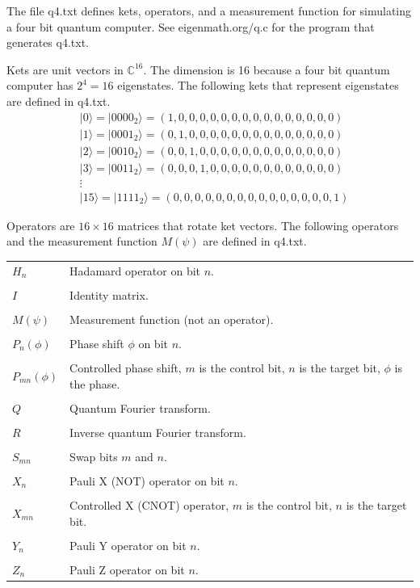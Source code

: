 \documentclass[12pt]{article}
\begin{document}
\noindent
The file q4.txt defines kets, operators, and a measurement function
for simulating a four bit quantum computer.
See eigenmath.org/q.c for the program that generates q4.txt.

\bigskip
\noindent
Kets are unit vectors in $\mathbb{C}^{16}$.
The dimension is 16 because a four bit quantum computer has $2^4=16$ eigenstates.
The following kets that represent eigenstates are defined in q4.txt.
\begin{align*}
&|0\rangle=|0000_2\rangle=(1,0,0,0,0,0,0,0,0,0,0,0,0,0,0,0)
\\
&|1\rangle=|0001_2\rangle=(0,1,0,0,0,0,0,0,0,0,0,0,0,0,0,0)
\\
&|2\rangle=|0010_2\rangle=(0,0,1,0,0,0,0,0,0,0,0,0,0,0,0,0)
\\
&|3\rangle=|0011_2\rangle=(0,0,0,1,0,0,0,0,0,0,0,0,0,0,0,0)
\\
&\vdots
\\
&|15\rangle=|1111_2\rangle=(0,0,0,0,0,0,0,0,0,0,0,0,0,0,0,1)
\end{align*}

\noindent
Operators are $16\times16$ matrices that rotate ket vectors.
The following operators and the measurement function $M(\psi)$ are defined in q4.txt.

\bigskip
\begin{tabular}{l l}
$H_n$ & Hadamard operator on bit $n$.
\\
\\
$I$ & Identity matrix.
\\
\\
$M(\psi)$ & Measurement function (not an operator).
\\
\\
$P_n(\phi)$ & Phase shift $\phi$ on bit $n$.
\\
\\
$P_{mn}(\phi)$ & Controlled phase shift, $m$ is the control bit, $n$ is the target bit, $\phi$ is the phase.
\\
\\
$Q$ & Quantum Fourier transform.
\\
\\
$R$ & Inverse quantum Fourier transform.
\\
\\
$S_{mn}$ & Swap bits $m$ and $n$.
\\
\\
$X_n$ & Pauli X (NOT) operator on bit $n$.
\\
\\
$X_{mn}$ & Controlled X (CNOT) operator, $m$ is the control bit, $n$ is the target bit.
\\
\\
$Y_n$ & Pauli Y operator on bit $n$.
\\
\\
$Z_n$ & Pauli Z operator on bit $n$.
\end{tabular}
\end{document}
